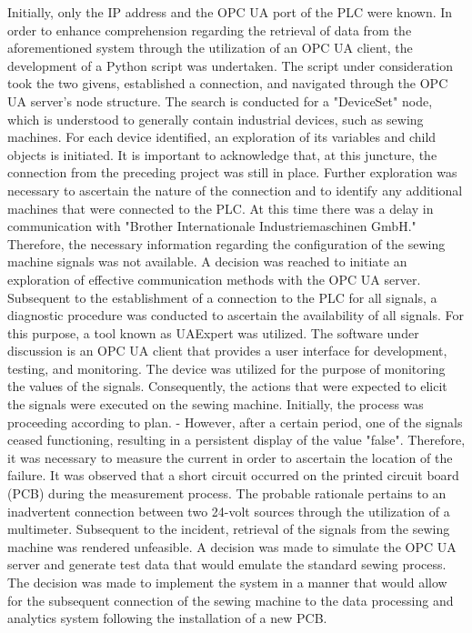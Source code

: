Initially, only the IP address and the OPC UA port of the PLC were known. In order to enhance comprehension regarding the retrieval of data from the aforementioned system through the utilization of an OPC UA client, the development of a Python script was undertaken. The script under consideration took the two givens, established a connection, and navigated through the OPC UA server's node structure. The search is conducted for a "DeviceSet" node, which is understood to generally contain industrial devices, such as sewing machines. For each device identified, an exploration of its variables and child objects is initiated. It is important to acknowledge that, at this juncture, the connection from the preceding project was still in place. Further exploration was necessary to ascertain the nature of the connection and to identify any additional machines that were connected to the PLC. At this time there was a delay in communication with "Brother Internationale Industriemaschinen GmbH." Therefore, the necessary information regarding the configuration of the sewing machine signals was not available. A decision was reached to initiate an exploration of effective communication methods with the OPC UA server.\\
Subsequent to the establishment of a connection to the PLC for all signals, a diagnostic procedure was conducted to ascertain the availability of all signals. For this purpose, a tool known as UAExpert was utilized. The software under discussion is an OPC UA client that provides a user interface for development, testing, and monitoring. The device was utilized for the purpose of monitoring the values of the signals. Consequently, the actions that were expected to elicit the signals were executed on the sewing machine. Initially, the process was proceeding according to plan. -	However, after a certain period, one of the signals ceased functioning, resulting in a persistent display of the value "false". Therefore, it was necessary to measure the current in order to ascertain the location of the failure. It was observed that a short circuit occurred on the printed circuit board (PCB) during the measurement process. The probable rationale pertains to an inadvertent connection between two 24-volt sources through the utilization of a multimeter.  Subsequent to the incident, retrieval of the signals from the sewing machine was rendered unfeasible. A decision was made to simulate the OPC UA server and generate test data that would emulate the standard sewing process. The decision was made to implement the system in a manner that would allow for the subsequent connection of the sewing machine to the data processing and analytics system following the installation of a new PCB.

